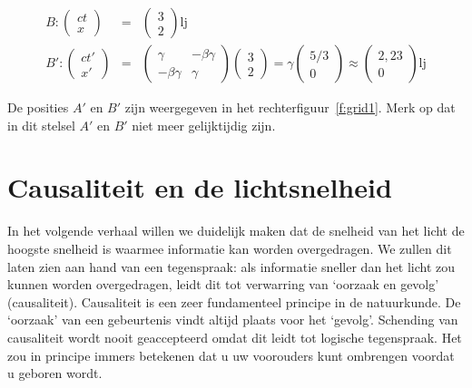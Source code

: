\begin{eqnarray}\nonumber
B: \left(\begin{array}{c} ct \\ x \end{array}\right) &=&  
  \left(\begin{array}{c} 3 \\ 2 \end{array}\right) \mbox{lj} \\ \nonumber
B':  \left(\begin{array}{c} ct' \\ x' \end{array}\right) &=&  
  \left(\begin{array}{cc} \gamma & -\beta \gamma \\ -\beta\gamma & \gamma \end{array}\right)
\left(\begin{array}{c} 3 \\ 2 \end{array}\right) =
\gamma \left(\begin{array}{c} 5/3 \\ 0  \end{array}\right) \approx \left(\begin{array}{c} 2,23 \\ 0 \end{array}\right) 
 \mbox{lj}
\end{eqnarray}

De posities $A'$ en $B'$ zijn weergegeven in het
rechterfiguur~\ref{f:grid1}. Merk op dat in dit stelsel $A'$ en $B'$
niet meer gelijktijdig zijn.

\section{Causaliteit en de lichtsnelheid}
In het volgende verhaal willen we duidelijk maken dat de snelheid van
het licht de hoogste snelheid is waarmee informatie kan worden
overgedragen. We zullen dit laten zien aan hand van een tegenspraak:
als informatie sneller dan het licht zou kunnen worden overgedragen,
leidt dit tot verwarring van `oorzaak en gevolg'
(causaliteit). Causaliteit is een zeer fundamenteel principe in de
natuurkunde.  De `oorzaak' van een gebeurtenis vindt altijd plaats
voor het `gevolg'. Schending van causaliteit wordt nooit geaccepteerd
omdat dit leidt tot logische tegenspraak.  Het zou in principe immers
betekenen dat u uw voorouders kunt ombrengen voordat u geboren wordt.


